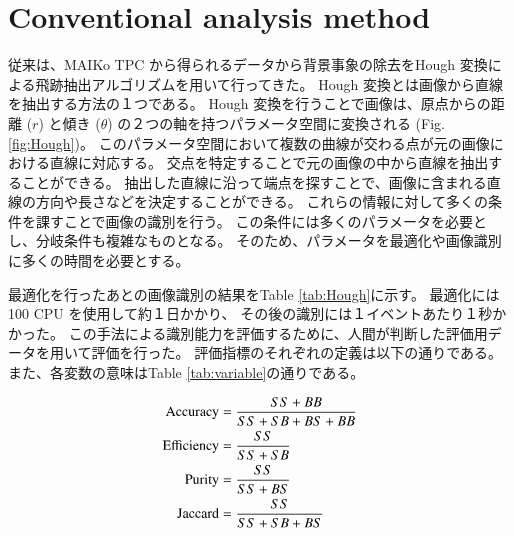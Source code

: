 \documentclass{jps-cp}
\begin{document}
\section{Conventional analysis method}
従来は、MAIKo TPC から得られるデータから背景事象の除去をHough 変換による飛跡抽出アルゴリズムを用いて行ってきた。
Hough 変換とは画像から直線を抽出する方法の１つである。
Hough 変換を行うことで画像は、原点からの距離 ($r$) と傾き ($\theta$) の２つの軸を持つパラメータ空間に変換される
(Fig. \ref{fig:Hough})。
このパラメータ空間において複数の曲線が交わる点が元の画像における直線に対応する。
交点を特定することで元の画像の中から直線を抽出することができる。
抽出した直線に沿って端点を探すことで、画像に含まれる直線の方向や長さなどを決定することができる。
これらの情報に対して多くの条件を課すことで画像の識別を行う。
この条件には多くのパラメータを必要とし、分岐条件も複雑なものとなる。
そのため、パラメータを最適化や画像識別に多くの時間を必要とする。

最適化を行ったあとの画像識別の結果をTable \ref{tab:Hough}に示す。
最適化には100 CPU を使用して約１日かかり、
その後の識別には１イベントあたり１秒かかった。
この手法による識別能力を評価するために、人間が判断した評価用データを用いて評価を行った。
評価指標のそれぞれの定義は以下の通りである。
また、各変数の意味はTable \ref{tab:variable}の通りである。

\begin{align}
  \rm{Accuracy} &= \frac{SS+BB}{SS+SB+BS+BB}\\
  \rm{Efficiency} &= \frac{SS}{SS+SB}\\
  \rm{Purity} &= \frac{SS}{SS+BS}\\
  \rm{Jaccard} &= \frac{SS}{SS+SB+BS}
\end{align}
\end{document}
